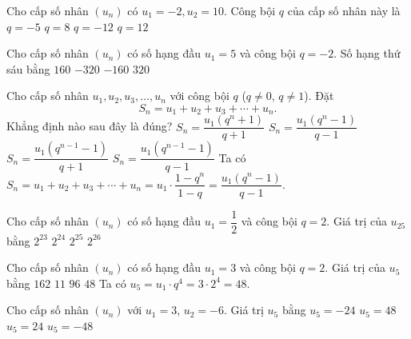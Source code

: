 \begin{ex}%
		Cho cấp số nhân $(u_n)$ có $u_1=-2,u_2=10$. Công bội $q$ của cấp số nhân này là 
		\choice
		{\True $q=-5$}
		{$q=8$}
		{$q=-12$}
		{$q=12$}
	\end{ex}%
\begin{ex}%
	Cho cấp số nhân $\left(u_n\right)$ có số hạng đầu $u_1=5$ và công bội $q=-2$. Số hạng thứ sáu bằng
	\choice
	{$160$}
	{$-320$}
	{\True $-160$}
	{$320$}
\end{ex}%
\begin{ex}%
 Cho cấp số nhân $u_1,u_2,u_3,\ldots,u_n$ với công bội $q$ ($q\neq 0$, $q\neq 1$). Đặt \[S_n=u_1+u_2+u_3+\cdots +u_n.\] Khẳng định nào sau đây là đúng?
 \choice
  {$S_n = \dfrac{u_1\left(q^n+1\right)}{q+1}$}
  {\True $S_n = \dfrac{u_1\left(q^n-1\right)}{q-1}$}
  {$S_n = \dfrac{u_1\left(q^{n-1}-1\right)}{q+1}$}
  {$S_n = \dfrac{u_1\left(q^{n-1}-1\right)}{q-1}$}
 \loigiai
  {
  Ta có $S_n=u_1+u_2+u_3+\cdots +u_n = u_1\cdot \dfrac{1-q^n}{1-q} = \dfrac{u_1\left(q^n-1\right)}{q-1}$.
  }
\end{ex}%
\begin{ex}%
	Cho cấp số nhân $(u_n)$ có số hạng đầu $u_1=\dfrac{1}{2}$ và công bội $q=2$. Giá trị của $u_{25}$ bằng
	\choice
	{\True $2^{23}$}	
	{$2^{24}$}
	{$2^{25}$}
	{$2^{26}$}
\end{ex}%
\begin{ex}%
 Cho cấp số nhân $(u_n)$ có số hạng đầu $u_1=3$ và công bội $q=2$. Giá trị của $u_5$ bằng
 \choice
  {$162$}
  {$11$}
  {$96$}
  {\True $48$}
 \loigiai
  {
  Ta có $u_5=u_1\cdot q^4=3\cdot 2^4=48$.
  }
\end{ex}%
\begin{ex}%
Cho cấp số nhân $(u_n)$  với $u_1=3$, $u_2 =-6$. Giá trị $u_5$ bằng 
\choice
{$u_5=-24$}
{\True $u_5 =48$}
{$u_5=24$}
{$u_5 =-48$}
\end{ex}%
